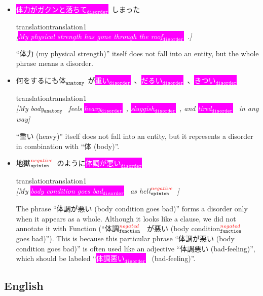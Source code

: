 \documentclass[12pt]{article}
\theoremstyle{definition}
\newcommand{\anatomy}[1]{\colorbox{dollarbill}{#1$_{\texttt{anatomy}}$}\ }
\newcommand{\disorder}[1]{\colorbox{fuchsia}{\textcolor{white}{#1$_{\texttt{disorder}}$}}\ }
\newcommand{\functionNeg}[1]{\colorbox{banana}{#1$_{\texttt{function}}^{\textcolor{red}{negated}}$}\ }
\newcommand{\opNeg}[1]{\colorbox{babyblue}{#1$_{\texttt{opinion}}^{\textcolor{red}{negative}}$}\ }
\newcommand{\translation}[1]{\begin{ocg}{translation}{translation}{1}\footnotesize{\\\textit{[#1]}}\end{ocg}}
\begin{document}
\begin{itemize}
    \item \disorder{体力がガクンと落ちて}しまった
        \translation{\disorder{My physical strength has gone through the roof}.}

        ``体力 (my physical strength)'' itself does not fall into an entity, but the whole phrase means a disorder.

    \item 何をするにも\anatomy{体}が\disorder{重い}、\disorder{だるい}、\disorder{きつい}
        \translation{My \anatomy{body} feels \disorder{heavy}, \disorder{sluggish}, and \disorder{tired} in any way}

        ``重い (heavy)'' itself does not fall into an entity, but it represents a disorder in combination with ``体 (body)''.

    \item \opNeg{地獄}のように\disorder{体調が悪い}
        \translation{My \disorder{body condition goes bad} as \opNeg{hell}}

        The phrase ``体調が悪い (body condition goes bad)'' forms a disorder only when it appears as a whole.
        Although it looks like a clause, we did not annotate it with Function (``\functionNeg{体調} が悪い (\functionNeg{body condition} goes bad)'').
        This is because this particular phrase ``体調が悪い (body condition goes bad)'' is often used like an adjective ``体調悪い (bad-feeling)'', which should be labeled ``\disorder{体調悪い} (bad-feeling)''.

\end{itemize}

\subsection{English}\label{sec:diff_cases_en}
\end{document}
